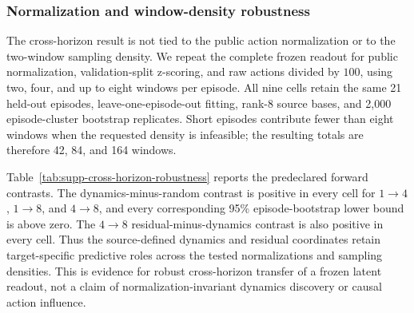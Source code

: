 \documentclass{article}
\begin{document}
\subsubsection{Normalization and window-density robustness}
\label{sec:supp-cross-horizon-robustness}

The cross-horizon result is not tied to the public action normalization or to
the two-window sampling density. We repeat the complete frozen readout for
public normalization, validation-split z-scoring, and raw actions divided by
$100$, using two, four, and up to eight windows per episode. All nine cells
retain the same 21 held-out episodes, leave-one-episode-out fitting, rank-$8$
source bases, and 2,000 episode-cluster bootstrap replicates. Short episodes
contribute fewer than eight windows when the requested density is infeasible;
the resulting totals are therefore 42, 84, and 164 windows.

Table~\ref{tab:supp-cross-horizon-robustness} reports the predeclared forward
contrasts. The dynamics-minus-random contrast is positive in every cell for
$1\to4$, $1\to8$, and $4\to8$, and every corresponding 95\% episode-bootstrap
lower bound is above zero. The $4\to8$ residual-minus-dynamics contrast is
also positive in every cell. Thus the source-defined dynamics and residual
coordinates retain target-specific predictive roles across the tested
normalizations and sampling densities. This is evidence for robust
cross-horizon transfer of a frozen latent readout, not a claim of
normalization-invariant dynamics discovery or causal action influence.
\end{document}
